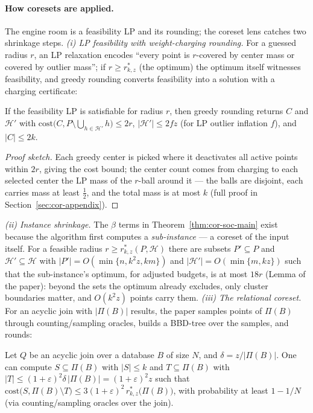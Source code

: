 \paragraph{How coresets are applied.}
The engine room is a feasibility LP and its rounding; the coreset lens
catches two shrinkage steps. \emph{(i) LP feasibility with
weight-charging rounding.} For a guessed radius $r$, an LP relaxation
encodes ``every point is $r$-covered by center mass or covered by
outlier mass''; if $r \ge r^*_{k,z}$ (the optimum) the optimum itself
witnesses feasibility, and greedy rounding converts feasibility into a
solution with a charging certificate:

\begin{lemma}\label{lem:cor-soc-charge}
If the feasibility LP is satisfiable for radius $r$, then greedy
rounding returns $C$ and $\mathcal{H}'$ with
$\mathrm{cost}\bigl(C, P \setminus \bigcup_{h\in\mathcal{H}'}
h\bigr) \le 2r$, $|\mathcal{H}'| \le 2fz$ (for LP outlier inflation
$f$), and $|C| \le 2k$. \eop
\end{lemma}

\begin{proof}[Proof sketch]
Each greedy center is picked where it deactivates all active points
within $2r$, giving the cost bound; the center count comes from
charging to each selected center the LP mass of the $r$-ball around it
--- the balls are disjoint, each carries mass at least $\tfrac12$, and
the total mass is at most $k$ (full proof in
Section~\ref{sec:cor-appendix}).
\end{proof}

\emph{(ii) Instance shrinkage.} The $\beta$ terms in
Theorem~\ref{thm:cor-soc-main} exist because the algorithm first
computes a \emph{sub-instance} --- a coreset of the input itself. For a
feasible radius $r \ge r^*_{k,z}(P,\mathcal{H})$ there are subsets
$P' \subseteq P$ and $\mathcal{H}' \subseteq \mathcal{H}$ with $|P'| =
O(\min\{n, k^2z, km\})$ and $|\mathcal{H}'| = O(\min\{m, kz\})$ such
that the sub-instance's optimum, for adjusted budgets, is at most $18r$
(Lemma of the paper): beyond the sets the optimum already excludes,
only cluster boundaries matter, and $O(k^2z)$ points carry them.
\emph{(iii) The relational coreset.} For an acyclic join with
$|\Pi(B)|$ results, the paper samples points of $\Pi(B)$ through
counting/sampling oracles, builds a BBD-tree over the samples, and
rounds:

\begin{lemma}\label{lem:cor-soc-rel}
Let $Q$ be an acyclic join over a database $B$ of size $N$, and
$\delta = z/|\Pi(B)|$. One can compute $S \subseteq \Pi(B)$ with
$|S| \le k$ and $T \subseteq \Pi(B)$ with $|T| \le (1+\varepsilon)^2
\delta\,|\Pi(B)| = (1+\varepsilon)^2 z$ such that
$\mathrm{cost}\bigl(S, \Pi(B) \setminus T\bigr) \le
3(1+\varepsilon)^2\, r^*_{k,z}\bigl(\Pi(B)\bigr)$, with probability at
least $1 - 1/N$ (via counting/sampling oracles over the join). \eop
\end{lemma}

